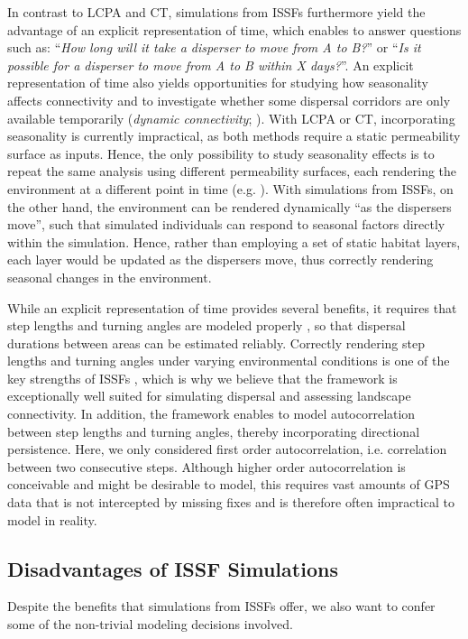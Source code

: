 \documentclass[abstract=on,10pt,a4paper,bibliography=totocnumbered]{article}
\begin{document}
In contrast to LCPA and CT, simulations from ISSFs furthermore yield the
advantage of an explicit representation of time, which enables to answer
questions such as: ``\textit{How long will it take a disperser to move from A to
B?}'' or ``\textit{Is it possible for a disperser to move from A to B within X
days?}''. An explicit representation of time also yields opportunities
for studying how seasonality affects connectivity and to investigate whether
some dispersal corridors are only available temporarily (\textit{dynamic
connectivity}; \citealp{Zeller.2020}). With LCPA or CT, incorporating
seasonality is currently impractical, as both methods require a static
permeability surface as inputs. Hence, the only possibility to study seasonality
effects is to repeat the same analysis using different permeability surfaces,
each rendering the environment at a different point in time (e.g.
\citealp{Benz.2016, Osipova.2019}). With simulations from ISSFs, on the other
hand, the environment can be rendered dynamically ``as the dispersers move'',
such that simulated individuals can respond to seasonal factors directly within
the simulation. Hence, rather than employing a set of static habitat layers,
each layer would be updated as the dispersers move, thus correctly rendering
seasonal changes in the environment.

While an explicit representation of time provides several benefits, it requires
that step lengths and turning angles are modeled properly
\citep{Kanagaraj.2013}, so that dispersal durations between areas can be
estimated reliably. Correctly rendering step lengths and turning angles under
varying environmental conditions is one of the key strengths of ISSFs
\citep{Avgar.2016, Prokopenko.2017, Fieberg.2020}, which is why we believe that
the framework is exceptionally well suited for simulating dispersal and
assessing landscape connectivity. In addition, the framework enables to model
autocorrelation between step lengths and turning angles, thereby incorporating
directional persistence. Here, we only considered first order autocorrelation,
i.e. correlation between two consecutive steps. Although higher order
autocorrelation is conceivable and might be desirable to model, this requires
vast amounts of GPS data that is not intercepted by missing fixes and is
therefore often impractical to model in reality.

\subsection{Disadvantages of ISSF Simulations}
Despite the benefits that simulations from ISSFs offer, we also want to confer
some of the non-trivial modeling decisions involved.
\end{document}
